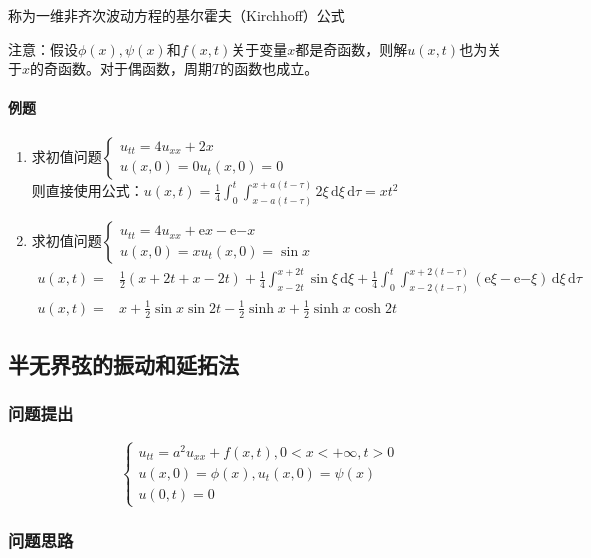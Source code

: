 称为一维非齐次波动方程的基尔霍夫（Kirchhoff）公式

注意：假设\(\phi(x),\psi(x)\)和\(f(x,t)\)关于变量\(x\)都是奇函数，则解\(u(x,t)\)也为关于\(x\)的奇函数。对于偶函数，周期\(T\)的函数也成立。

\paragraph{例题}
\begin{enumerate}
    \item 求初值问题\(\begin{cases}u_{tt}=4u_{xx}+2x\\u(x,0)=0u_t(x,0)=0\end{cases}\)\\
    则直接使用公式：\(u(x,t)=\frac{1}{4}\int_{0}^{t}{\int_{x-a(t-\tau)}^{x+a(t-\tau)}2\xi \,\mathrm{d}\xi \,\mathrm{d}\tau}=xt^2\)
    \item 求初值问题\(\begin{cases}u_{tt}=4u_{xx}+\mathrm{e}x-\mathrm{e}{-x}\\u(x,0)=xu_t(x,0)=\sin{x}\end{cases}\)
    \begin{align*}
    u(x,t)=&\frac{1}{2}\left(x+2t+x-2t\right)+\frac{1}{4}\int_{x-2t}^{x+2t}{\sin{\xi}\,\mathrm{d}\xi}+\frac{1}{4}\int_{0}^{t}{\int_{x-2(t-\tau)}^{x+2(t-\tau)}\left(\mathrm{e}\xi-\mathrm{e}{-\xi}\right)\,\mathrm{d}\xi \,\mathrm{d}\tau}\\
	u(x,t)=&x+\frac{1}{2}\sin{x}\sin{2t}-\frac{1}{2}\sinh{x}+\frac{1}{2}\sinh{x}\cosh{2t}
    \end{align*}
\end{enumerate}
	
\subsection{半无界弦的振动和延拓法}

\subsubsection{问题提出}
\[\begin{cases}
u_{tt}=a^2u_{xx}+f(x,t),0<x<+\infty,t>0\\
u(x,0)=\phi(x),u_t(x,0)=\psi(x)\\
u(0,t)=0
\end{cases}\]

\subsubsection{问题思路}

